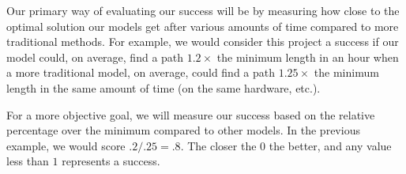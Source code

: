 \documentclass{article}
\begin{document}
Our primary way of evaluating our success will be by measuring how close to the optimal solution our models get after various amounts of time compared to more traditional methods. For example,
we would consider this project a success if our model could, on average, find a path \(1.2\times\) the minimum length in an hour when a more traditional model, on average, could find a path \(1.25\times\) the
minimum length in the same amount of time (on the same hardware, etc.).

For a more objective goal, we will measure our success based on the relative percentage over the minimum compared to other models. In the previous example, we would score \(.2/.25 = .8\).
The closer the \(0\) the better, and any value less than \(1\) represents a success.




\end{document}
